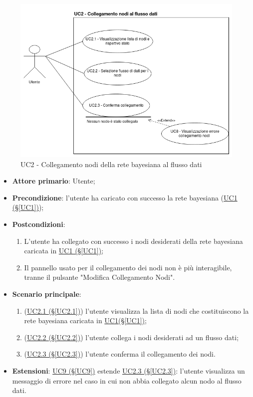 \begin{figure}[H]
\centering
\includegraphics[scale=0.5]{./images/UC2.png}
\caption{UC2 - Collegamento nodi della rete bayesiana al flusso dati}
\end{figure}

\begin{itemize}
\item \textbf{Attore primario}: Utente;
\item \textbf{Precondizione}: l'utente ha caricato con successo la rete bayesiana (\hyperref[UC1]{UC1 (§\ref*{UC1})});
\item \textbf{Postcondizioni}: 
	\begin{enumerate}
	\item L'utente ha collegato con successo i nodi desiderati della rete bayesiana caricata in \hyperref[UC1]{UC1 				(§\ref*{UC1})};
	\item Il pannello usato per il collegamento dei nodi non è più interagibile, tranne il pulsante "Modifica 							Collegamento Nodi".
	\end{enumerate}
\item \textbf{Scenario principale}:
	\begin{enumerate}
	\item (\hyperref[UC2.1]{UC2.1 (§\ref*{UC2.1})}) l'utente visualizza la lista di nodi che costituiscono la rete bayesiana caricata in \hyperref[UC1]{UC1(§\ref*{UC1})};
	\item (\hyperref[UC2.2]{UC2.2 (§\ref*{UC2.2})}) l'utente collega i nodi desiderati ad un flusso dati;
	\item (\hyperref[UC2.3]{UC2.3 (§\ref*{UC2.3})}) l'utente conferma il collegamento dei nodi.
	\end{enumerate}
\item \textbf{Estensioni}: \hyperref[UC9]{UC9 (§\ref*{UC9})} estende \hyperref[UC2.3]{UC2.3 (§\ref*{UC2.3})}: l'utente visualizza un messaggio di errore nel caso in cui non abbia collegato alcun nodo al flusso dati.
\end{itemize}

